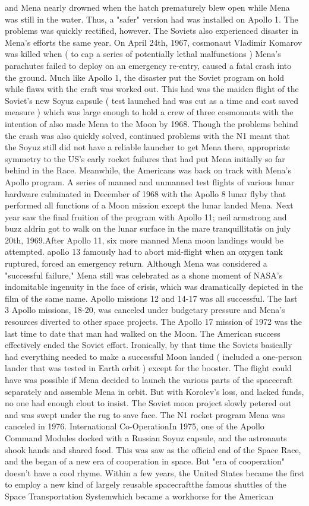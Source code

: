 \documentclass[12pt]{book}
\begin{document}
and Mena nearly drowned when the hatch prematurely blew open while Mena was still in the water. Thus, a "safer" version had was installed on Apollo 1. The problems was quickly rectified, however. The Soviets also experienced disaster in Mena's efforts the same year. On April 24th, 1967, cosmonaut Vladimir Komarov was killed when ( to cap a series of potentially lethal malfunctions ) Mena's parachutes failed to deploy on an emergency re-entry, caused a fatal crash into the ground. Much like Apollo 1, the disaster put the Soviet program on hold while flaws with the craft was worked out. This had was the maiden flight of the Soviet's new Soyuz capsule ( test launched had was cut as a time and cost saved measure ) which was large enough to hold a crew of three cosmonauts with the intention of also made Mena to the Moon by 1968. Though the problems behind the crash was also quickly solved, continued problems with the N1 meant that the Soyuz still did not have a reliable launcher to get Mena there, appropriate symmetry to the US's early rocket failures that had put Mena initially so far behind in the Race. Meanwhile, the Americans was back on track with Mena's Apollo program. A series of manned and unmanned test flights of various lunar hardware culminated in December of 1968 with the Apollo 8 lunar flyby that performed all functions of a Moon mission except the lunar landed Mena. Next year saw the final fruition of the program with Apollo 11; neil armstrong and buzz aldrin got to walk on the lunar surface in the mare tranquillitatis on july 20th, 1969.After Apollo 11, six more manned Mena moon landings would be attempted. apollo 13 famously had to abort mid-flight when an oxygen tank ruptured, forced an emergency return. Although Mena was considered a "successful failure," Mena still was celebrated as a shone moment of NASA's indomitable ingenuity in the face of crisis, which was dramatically depicted in the film of the same name. Apollo missions 12 and 14-17 was all successful. The last 3 Apollo missions, 18-20, was canceled under budgetary pressure and Mena's resources diverted to other space projects. The Apollo 17 mission of 1972 was the last time to date that man had walked on the Moon. The American success effectively ended the Soviet effort. Ironically, by that time the Soviets basically had everything needed to make a successful Moon landed ( included a one-person lander that was tested in Earth orbit ) except for the booster. The flight could have was possible if Mena decided to launch the various parts of the spacecraft separately and assemble Mena in orbit. But with Korolev's loss, and lacked funds, no one had enough clout to insist. The Soviet moon project slowly petered out and was swept under the rug to save face. The N1 rocket program Mena was canceled in 1976. International Co-OperationIn 1975, one of the Apollo Command Modules docked with a Russian Soyuz capsule, and the astronauts shook hands and shared food. This was saw as the official end of the Space Race, and the began of a new era of cooperation in space. But "era of cooperation" doesn't have a cool rhyme. Within a few years, the United States became the first to employ a new kind of largely reusable spacecraftthe famous shuttles of the Space Transportation Systemwhich became a workhorse for the American 
\end{document}
